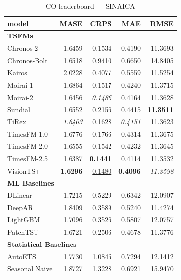 \begin{table}[H]
\caption{CO leaderboard --- SINAICA}
\centering
\begin{small}
\begin{tabular}{lrrrr}
\toprule
model & MASE & CRPS & MAE & RMSE \\
\midrule
\multicolumn{5}{l}{\textbf{TSFMs}} \\
Chronos-2 & 1.6459 & 0.1534 & 0.4190 & 11.3693 \\
Chronos-Bolt & 1.6518 & 0.9410 & 0.6650 & 14.8405 \\
Kairos & 2.0228 & 0.4077 & 0.5559 & 11.5254 \\
Moirai-1 & 1.6864 & 0.1517 & 0.4240 & 11.3715 \\
Moirai-2 & 1.6456 & \textit{0.1486} & 0.4164 & 11.3628 \\
Sundial & 1.6552 & 0.2156 & 0.4415 & \textbf{11.3511} \\
TiRex & \textit{1.6403} & 0.1628 & \textit{0.4151} & 11.3623 \\
TimesFM-1.0 & 1.6776 & 0.1766 & 0.4314 & 11.3675 \\
TimesFM-2.0 & 1.6555 & 0.1542 & 0.4232 & 11.3645 \\
TimesFM-2.5 & \underline{1.6387} & \textbf{0.1441} & \underline{0.4114} & \underline{11.3532} \\
VisionTS++ & \textbf{1.6296} & \underline{0.1480} & \textbf{0.4096} & \textit{11.3598} \\
\midrule
\multicolumn{5}{l}{\textbf{ML Baselines}} \\
DLinear & 1.7215 & 0.5229 & 0.6342 & 12.0907 \\
DeepAR & 1.8409 & 0.3589 & 0.5240 & 11.4274 \\
LightGBM & 1.7096 & 0.3526 & 0.5807 & 12.0757 \\
PatchTST & 1.6721 & 0.2506 & 0.4678 & 11.3776 \\
\midrule
\multicolumn{5}{l}{\textbf{Statistical Baselines}} \\
AutoETS & 1.7730 & 1.0845 & 0.7294 & 12.1412 \\
Seasonal Naive & 1.8727 & 1.3228 & 0.6921 & 15.9470 \\
\bottomrule
\end{tabular}
\end{small}
\end{table}